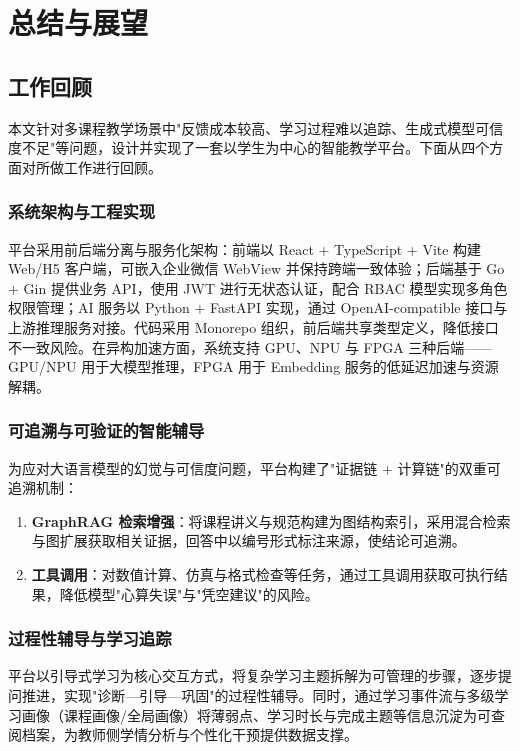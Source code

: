\chapter{总结与展望}

\section{工作回顾}
本文针对多课程教学场景中"反馈成本较高、学习过程难以追踪、生成式模型可信度不足"等问题，设计并实现了一套以学生为中心的智能教学平台。下面从四个方面对所做工作进行回顾。

\subsection{系统架构与工程实现}
平台采用前后端分离与服务化架构：前端以 React + TypeScript + Vite 构建 Web/H5 客户端，可嵌入企业微信 WebView 并保持跨端一致体验；后端基于 Go + Gin 提供业务 API，使用 JWT 进行无状态认证，配合 RBAC 模型实现多角色权限管理；AI 服务以 Python + FastAPI 实现，通过 OpenAI-compatible 接口与上游推理服务对接。代码采用 Monorepo 组织，前后端共享类型定义，降低接口不一致风险。在异构加速方面，系统支持 GPU、NPU 与 FPGA 三种后端——GPU/NPU 用于大模型推理，FPGA 用于 Embedding 服务的低延迟加速与资源解耦。

\subsection{可追溯与可验证的智能辅导}
为应对大语言模型的幻觉与可信度问题，平台构建了"证据链 + 计算链"的双重可追溯机制：
\begin{enumerate}[label=(\arabic*)]
  \item \textbf{GraphRAG 检索增强}：将课程讲义与规范构建为图结构索引，采用混合检索与图扩展获取相关证据，回答中以编号形式标注来源，使结论可追溯。
  \item \textbf{工具调用}：对数值计算、仿真与格式检查等任务，通过工具调用获取可执行结果，降低模型"心算失误"与"凭空建议"的风险。
\end{enumerate}

\subsection{过程性辅导与学习追踪}
平台以引导式学习为核心交互方式，将复杂学习主题拆解为可管理的步骤，逐步提问推进，实现"诊断—引导—巩固"的过程性辅导。同时，通过学习事件流与多级学习画像（课程画像/全局画像）将薄弱点、学习时长与完成主题等信息沉淀为可查阅档案，为教师侧学情分析与个性化干预提供数据支撑。

